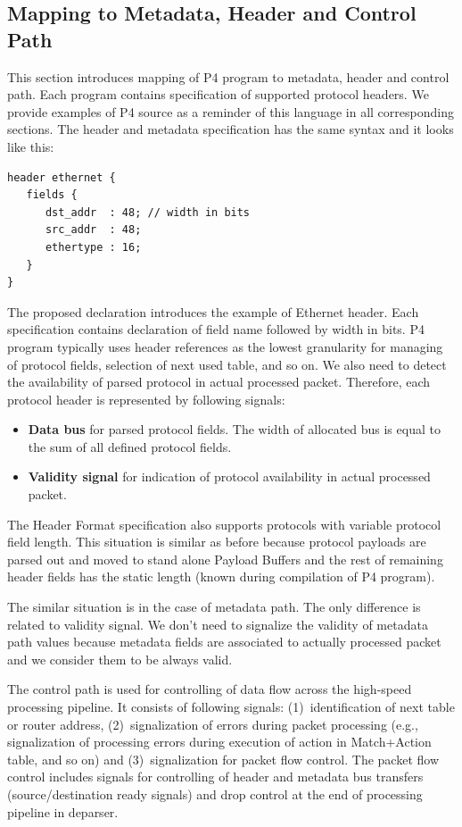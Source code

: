 \subsection{Mapping to Metadata, Header and Control Path}
This section introduces mapping of P4 program to metadata, header and control path. Each program contains specification of
supported protocol headers. We provide examples of P4 source as a reminder of this language in all corresponding sections.
The header and metadata specification has the same syntax and it looks like this:

\begin{Verbatim}[fontsize=\small]
header ethernet {
   fields {
      dst_addr  : 48; // width in bits
      src_addr  : 48;
      ethertype : 16;
   }
}
\end{Verbatim}

The proposed declaration introduces the example of Ethernet header. Each specification contains declaration of field name followed by width
in bits. P4 program typically uses header references as the lowest granularity for managing of protocol fields, selection of next used table, 
and so on. We also need to detect the availability of parsed protocol in actual processed packet. 
Therefore, each protocol header is represented by following signals:
\begin{itemize}
    \item \textbf{Data bus} for parsed protocol fields. The width of allocated bus is equal to the sum of all defined protocol fields.
    \item \textbf{Validity signal} for indication of protocol availability in actual processed packet.
\end{itemize}

The Header Format specification also supports protocols with variable protocol field length.
This situation is similar as before because protocol payloads are parsed out and moved to 
stand alone Payload Buffers and the rest of remaining header fields has the static length (known during compilation of P4 program). 

The similar situation is in the case of metadata path. The only difference is related to validity signal.
We don't need to signalize the validity of metadata path values because metadata fields are associated 
to actually processed packet and we consider them to be always valid.

The control path is used for controlling of data flow across the high-speed processing pipeline. 
It consists of following signals: (1)~identification of next table or router address, (2)~signalization of errors during packet processing 
(e.g., signalization of processing errors during execution of action in Match+Action table, and so on) and
(3)~signalization for packet flow control. The packet flow control includes signals for controlling of header and metadata 
bus transfers (source/destination ready signals) and drop control at the end of processing pipeline in deparser.

